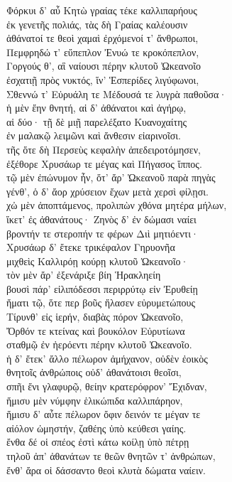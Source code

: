 \begin{pages}
\begin{Leftside}
{\minion\Para}
Φόρκυι δ' αὖ Κητὼ γραίας τέκε καλλιπαρήους \\
ἐκ γενετῆς πολιάς, τὰς δὴ Γραίας καλέουσιν\\
ἀθάνατοί τε θεοὶ χαμαὶ ἐρχόμενοί τ' ἄνθρωποι,\\
Πεμφρηδώ τ' εὔπεπλον Ἐνυώ τε κροκόπεπλον,\\
Γοργούς θ', αἳ ναίουσι πέρην κλυτοῦ Ὠκεανοῖο\\
ἐσχατιῇ πρὸς νυκτός, ἵν' Ἑσπερίδες λιγύφωνοι, \\
Σθεννώ τ' Εὐρυάλη τε Μέδουσά τε λυγρὰ παθοῦσα· \\
ἡ μὲν ἔην θνητή, αἱ δ' ἀθάνατοι καὶ ἀγήρῳ, \\
αἱ δύο· τῇ δὲ μιῇ παρελέξατο Κυανοχαίτης \\
ἐν μαλακῷ λειμῶνι καὶ ἄνθεσιν εἰαρινοῖσι. \\
τῆς ὅτε δὴ Περσεὺς κεφαλὴν ἀπεδειροτόμησεν,  \\
ἐξέθορε Χρυσάωρ τε μέγας καὶ Πήγασος ἵππος.\\
τῷ μὲν ἐπώνυμον ἦν, ὅτ' ἄρ' Ὠκεανοῦ παρὰ πηγὰς\\
γένθ', ὁ δ' ἄορ χρύσειον ἔχων μετὰ χερσὶ φίλῃσι. \\
χὠ μὲν ἀποπτάμενος, προλιπὼν χθόνα μητέρα μήλων,\\
ἵκετ' ἐς ἀθανάτους· Ζηνὸς δ' ἐν δώμασι ναίει  \\
βροντήν τε στεροπήν τε φέρων Διὶ μητιόεντι·\\
Χρυσάωρ δ' ἔτεκε τρικέφαλον Γηρυονῆα\\
μιχθεὶς Καλλιρόῃ κούρῃ κλυτοῦ Ὠκεανοῖο· \\
τὸν μὲν ἄρ' ἐξενάριξε βίη Ἡρακληείη\\
βουσὶ πάρ' εἰλιπόδεσσι περιρρύτῳ εἰν Ἐρυθείῃ \\
ἤματι τῷ, ὅτε περ βοῦς ἤλασεν εὐρυμετώπους \\
Τίρυνθ' εἰς ἱερήν, διαβὰς πόρον Ὠκεανοῖο, \\
Ὄρθόν τε κτείνας καὶ βουκόλον Εὐρυτίωνα\\
σταθμῷ ἐν ἠερόεντι πέρην κλυτοῦ Ὠκεανοῖο.\\

\quad{}ἡ δ' ἔτεκ' ἄλλο πέλωρον ἀμήχανον, οὐδὲν ἐοικὸς  \\
θνητοῖς ἀνθρώποις οὐδ' ἀθανάτοισι θεοῖσι, \\
σπῆι ἔνι γλαφυρῷ, θείην κρατερόφρον' Ἔχιδναν, \\
ἥμισυ μὲν νύμφην ἑλικώπιδα καλλιπάρηον, \\
ἥμισυ δ' αὖτε πέλωρον ὄφιν δεινόν τε μέγαν τε\\
αἰόλον ὠμηστήν, ζαθέης ὑπὸ κεύθεσι γαίης.  \\
ἔνθα δέ οἱ σπέος ἐστὶ κάτω κοίλῃ ὑπὸ πέτρῃ\\
τηλοῦ ἀπ' ἀθανάτων τε θεῶν θνητῶν τ' ἀνθρώπων,\\
ἔνθ' ἄρα οἱ δάσσαντο θεοὶ κλυτὰ δώματα ναίειν.\\


\end{Leftside}
\end{pages}
